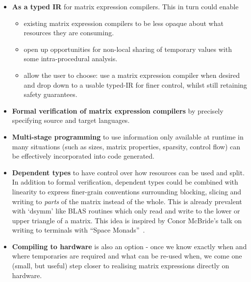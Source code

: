 \begin{itemize}

    \item \textbf{As a typed IR} for matrix expression compilers. This in turn
        could enable
        \begin{itemize}
            \item existing matrix expression compilers to be less opaque about
                what resources they are consuming.
            \item open up opportunities for non-local sharing of temporary values
                with some intra-procedural analysis.
            \item allow the user to choose: use a matrix expression compiler when
                desired and drop down to a usable typed-IR for finer control,
                whilst still retaining safety guarantees.
        \end{itemize}

    \item \textbf{Formal verification of matrix expression compilers} by
        precisely specifying source and target languages.

    \item \textbf{Multi-stage programming} to use information only available
        at runtime in many situations (such as sizes, matrix properties,
        sparsity, control flow) can be effectively incorporated into code
        generated.

    \item \textbf{Dependent types} to have control over how resources can be
        used and split. In addition to formal verification, dependent types
        could be combined with linearity to express finer-grain conventions
        surrounding blocking, slicing and writing to \emph{parts} of the matrix
        instead of the whole. This is already prevalent with `dsymm' like BLAS
        routines which only read and write to the lower or upper triangle of a
        matrix.  This idea is inspired by Conor McBride's talk on writing to
        terminals with ``Space Monads''~\cite{space_monads}.

    \item \textbf{Compiling to hardware} is also an option - once we know
        exactly when and where temporaries are required and what can be re-used
        when, we come one (small, but useful) step closer to realising matrix
        expressions directly on hardware.

\end{itemize}

